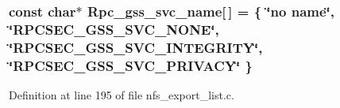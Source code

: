 \subsubsection{\setlength{\rightskip}{0pt plus 5cm}const char$\ast$ {\bf Rpc\_\-gss\_\-svc\_\-name}[$\,$] = \{ \char`\"{}no name\char`\"{}, \char`\"{}RPCSEC\_\-GSS\_\-SVC\_\-NONE\char`\"{}, \char`\"{}RPCSEC\_\-GSS\_\-SVC\_\-INTEGRITY\char`\"{}, \char`\"{}RPCSEC\_\-GSS\_\-SVC\_\-PRIVACY\char`\"{} \}}\label{nfs__export__list_8c_a0}




Definition at line 195 of file nfs\_\-export\_\-list.c.